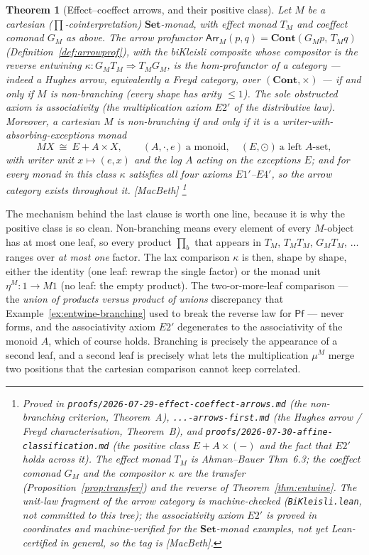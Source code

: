 \documentclass[11pt,a4paper]{book}
\newcommand{\Set}{\mathbf{Set}}
\newcommand{\Cont}{\mathbf{Cont}}
\newcommand{\Arr}{\mathsf{Arr}}
\theoremstyle{plain}
\newtheorem{Theorem}{Theorem}[chapter]
\theoremstyle{definition}
\theoremstyle{remark}
\newcommand{\prov}[1]{\hfill\textsf{\footnotesize[#1]}}
\begin{document}
\begin{Theorem}[Effect--coeffect arrows, and their positive class]\label{thm:arrows}
Let $M$ be a cartesian ($\prod$-cointerpretation) $\Set$-monad, with effect monad
$T_{M}$ and coeffect comonad $G_{M}$ as above. The arrow profunctor
$\Arr_{M}(p,q)=\Cont(G_{M}p,\,T_{M}q)$ (Definition~\ref{def:arrowprof}), with the
biKleisli composite whose compositor is the reverse entwining
$\kappa\colon G_{M}T_{M}\Rightarrow T_{M}G_{M}$, is the hom-profunctor of a
category --- indeed a Hughes arrow, equivalently a Freyd category, over
$(\Cont,\times)$ --- \emph{if and only if $M$ is non-branching} (every shape has
arity $\le 1$). The sole obstructed axiom is associativity (the multiplication
axiom $E2'$ of the distributive law). Moreover, a cartesian $M$ is non-branching if
and only if it is a \emph{writer-with-absorbing-exceptions} monad
\[
  M X\ \cong\ E + A\times X,\qquad (A,\cdot,e)\ \text{a monoid},\quad
  (E,\odot)\ \text{a left $A$-set},
\]
with writer unit $x\mapsto(e,x)$ and the log $A$ acting on the exceptions $E$; and
for \emph{every} monad in this class $\kappa$ satisfies all four axioms $E1'$--$E4'$,
so the arrow category exists throughout it.
\prov{MacBeth}%
\footnote{Proved in \texttt{proofs/2026-07-29-effect-coeffect-arrows.md} (the
non-branching criterion, Theorem~A), \texttt{...-arrows-first.md} (the Hughes
arrow / Freyd characterisation, Theorem~B), and
\texttt{proofs/2026-07-30-affine-classification.md} (the positive class
$E+A\times(-)$ and the fact that $E2'$ holds across it). The effect monad $T_{M}$ is
Ahman--Bauer \cite{AhmanBauer24} Thm~6.3; the coeffect comonad $G_{M}$ and the
compositor $\kappa$ are the transfer (Proposition~\ref{prop:transfer}) and the
reverse of Theorem~\ref{thm:entwine}. The unit-law fragment of the arrow category is
machine-checked (\texttt{BiKleisli.lean}, not committed to this tree); the
associativity axiom $E2'$ is proved in coordinates and machine-verified for the
$\Set$-monad examples, not yet Lean-certified in general, so the tag is
\textsf{[MacBeth]}.}
\end{Theorem}

The mechanism behind the last clause is worth one line, because it is why the
positive class is so clean. Non-branching means every element of every $M$-object
has at most one leaf, so every product $\prod_{b}$ that appears in $T_{M}$,
$T_{M}T_{M}$, $G_{M}T_{M}$, $\dots$ ranges over \emph{at most one} factor. The lax
comparison $\kappa$ is then, shape by shape, either the identity (one leaf: rewrap
the single factor) or the monad unit $\eta^{M}\colon 1\to M1$ (no leaf: the empty
product). The two-or-more-leaf comparison --- the \emph{union of products versus
product of unions} discrepancy that Example~\ref{ex:entwine-branching} used to break
the reverse law for $\mathsf{Pf}$ --- never forms, and the associativity axiom $E2'$
degenerates to the associativity of the monoid $A$, which of course holds. Branching
is precisely the appearance of a second leaf, and a second leaf is precisely what
lets the multiplication $\mu^{M}$ merge two positions that the cartesian comparison
cannot keep correlated.
\end{document}
